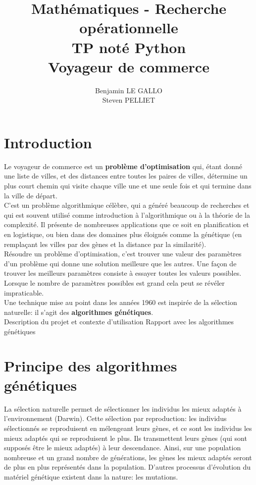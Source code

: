 \documentclass[a4paper,10pt]{report}
\title{Mathématiques - Recherche opérationnelle \\
TP noté Python \\
\textbf{Voyageur de commerce}}
\author{Benjamin LE GALLO \\
Steven PELLIET}
\begin{document}
\maketitle

\chapter*{Introduction}
 
Le voyageur de commerce est un \textbf{problème d'optimisation} qui, étant donné une liste de villes, 
et des distances entre toutes les paires de villes, détermine un plus court chemin qui visite chaque ville 
une et une seule fois et qui termine dans la ville de départ. \\

C'est un problème algorithmique célèbre, qui a généré beaucoup de recherches et qui est souvent utilisé comme 
introduction à l'algorithmique ou à la théorie de la complexité. Il présente de nombreuses applications que ce soit 
en planification et en logistique, ou bien dans des domaines plus éloignés comme la génétique 
(en remplaçant les villes par des gènes et la distance par la similarité). \\

Résoudre un problème d'optimisation, c'est trouver une valeur des paramètres d'un problème qui donne une solution 
meilleure que les autres. Une façon de trouver les meilleurs paramètres consiste à essayer toutes les valeurs possibles.
Lorsque le nombre de paramètres possibles est grand cela peut se révéler impraticable.\\

Une technique mise au point dans les années 1960 est inspirée de la sélection naturelle: il s'agit 
des \textbf{algorithmes génétiques}. \\

Description du projet et contexte d'utilisation
Rapport avec les algorithmes génétiques
 
\chapter*{Principe des algorithmes génétiques}

La sélection naturelle permet de sélectionner les individus les mieux adaptés à l'environnement (Darwin). Cette sélection
par reproduction: les individus sélectionnés se reproduisent en mélengeant leurs gènes, et ce sont les individus les mieux 
adaptés qui se reproduisent le plus. Ils transmettent leurs gènes (qui sont supposés être le mieux adaptés) à leur descendance.
Ainsi, sur une population nombreuse et un grand nombre de générations, les gènes les mieux adaptés seront de plus en plus
représentés dans la population. D'autres processus d'évolution du matériel génétique existent dans la nature: les mutations. \\
\end{document}
